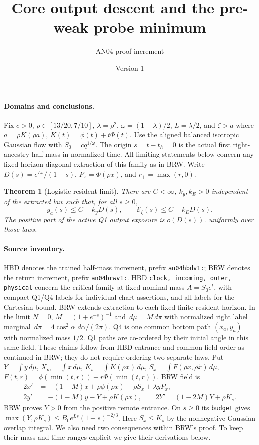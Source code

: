 \documentclass[11pt]{article}
\title{Core output descent and the pre-weak probe minimum}
\author{AN04 proof increment}\date{Version 1}
\newtheorem{theorem}{Theorem}
\newcommand{\dd}{\,d}
\begin{document}
\maketitle

\paragraph{Domains and conclusions.}
Fix $c>0$, $\rho\in[13/20,7/10]$, $\lambda=\rho^2$,
$\omega=(1-\lambda)/2$, $L=\lambda/2$, and $\zeta>a$ where
$a=\rho K(\rho a)$, $K(t)=\phi(t)+t\Phi(t)$. Use the aligned balanced
isotropic Gaussian flow with $S_0=cq^{1/\omega}$. The origin
$s=t-t_h=0$ is the actual first right-ancestry half mass in normalized
time. All limiting statements below concern any fixed-horizon
diagonal extraction of this family as in BRW. Write
$D(s)=e^{Ls}/(1+s)$, $P_x=\Phi(\rho x)$, and $r_+=\max(r,0)$.

\begin{theorem}[Logistic resident limit]\label{an04codv1:main}
There are $C<\infty$, $k_y,k_E>0$ independent of the extracted law
such that, for all $s\ge0$,
\[
 y_a(s)\le C-k_yD(s),\qquad
 \mathcal E_\zeta(s)\le C-k_ED(s).
\]
The positive part of the active Q1 output exposure is $o(D(s))$,
uniformly over those laws.
\end{theorem}

\paragraph{Source inventory.}
HBD denotes the trained half-mass increment, prefix \texttt{an04hbdv1:};
BRW denotes the return increment, prefix \texttt{an04brwv1:}.
HBD \texttt{clock, incoming, outer, physical} concern the critical
family at fixed nominal mass $A=S_0e^t$, with compact Q1/Q4 labels
for individual chart assertions, and all labels for the Cartesian
bound. BRW extends extraction to each fixed finite resident horizon.
In the limit $N=0$, $M=(1+e^{-s})^{-1}$ and $\dd\mu=M\dd\pi$ with
normalized right label marginal $\dd\pi=4\cos^2\alpha\,\dd\alpha/(2\pi)$.
Q4 is one common bottom path $(x_a,y_a)$ with normalized mass $1/2$.
Q1 paths are co-ordered by their initial angle in this same field.
These claims follow from HBD entrance and common-field order as
continued in BRW; they do not require ordering two separate laws.
Put $Y=\int y\dd\mu$, $X_m=\int x\dd\mu$, $K_s=\int K(\rho x)\dd\mu$,
$S_x=\int F(\rho x,\rho\tilde x)\dd\mu$,
$F(t,r)=\phi(\min(t,r))+r\Phi(\min(t,r))$. BRW field is
\begin{align}
 2x'&=-(1-M)x+\rho\phi(\rho x)-\rho S_x+\lambda yP_x,\nonumber\\
 2y'&=-(1-M)y-Y+\rho K(\rho x),\qquad
 2Y'=(1-2M)Y+\rho K_s .\label{an04codv1:field}
\end{align}
BRW proves $Y>0$ from the positive remote entrance. On $s\ge0$ its
\texttt{budget} gives
$\max(Y,\rho K_s)\le B_0e^{Ls}(1+s)^{-2/3}$.
Here $S_x\le K_s$ by the nonnegative Gaussian overlap integral.
We also need two consequences within BRW's proof. To keep their
mass and time ranges explicit we give their derivations below.
\end{document}
